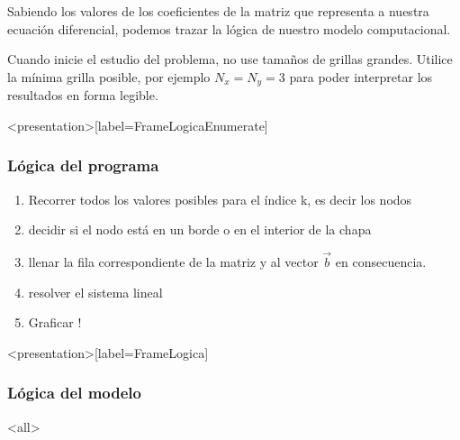 
Sabiendo los valores de los coeficientes de la matriz que 
representa a nuestra ecuación diferencial, podemos trazar la 
lógica de nuestro modelo computacional.

Cuando inicie el estudio del problema, no use tamaños de grillas 
grandes. Utilice la mínima grilla posible, por ejemplo
$N_x = N_y = 3$ para poder interpretar los resultados 
en forma legible. 

\mode*

\begin{frame}<presentation>[label=FrameLogicaEnumerate]
  \frametitle{Lógica del programa}
  
\begin{enumerate}
    \item<+-> Recorrer todos los valores posibles para el índice k, es decir los nodos
    \item<+-> decidir si el nodo está en un borde o en el interior de la chapa
    \item<+-> llenar la fila correspondiente de la matriz y al vector $\vec{b}$
      en consecuencia.
    \item<+-> resolver el sistema lineal
    \item<+-> Graficar !
\end{enumerate}

\end{frame}

\begin{frame}<presentation>[label=FrameLogica]
  \frametitle{Lógica del modelo}
\end{frame}

\mode<all>
